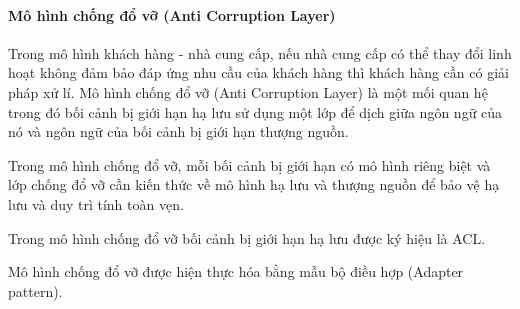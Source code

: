 


\paragraph{Mô hình chống đổ vỡ (Anti Corruption Layer)}        Trong mô hình khách hàng - nhà cung cấp, nếu nhà cung cấp có thể thay đổi linh hoạt không đảm bảo đáp ứng nhu cầu của khách hàng thì khách hàng cần có giải pháp xử lí. Mô hình chống đổ vỡ (Anti Corruption Layer) là một mối quan hệ trong đó bối cảnh bị giới hạn hạ lưu sử dụng một lớp để dịch giữa ngôn ngữ của nó và ngôn ngữ của bối cảnh bị giới hạn thượng nguồn.

Trong mô hình chống đổ vỡ, mỗi bối cảnh bị giới hạn có mô hình riêng biệt và lớp chống đổ vỡ cần kiến thức về mô hình hạ lưu và thượng nguồn để bảo vệ hạ lưu và duy trì tính toàn vẹn. 


Trong mô hình chống đổ vỡ bối cảnh bị giới hạn hạ lưu được ký hiệu là ACL.



Mô hình chống đổ vỡ được hiện thực hóa bằng   mẫu bộ điều hợp  (Adapter pattern).



















